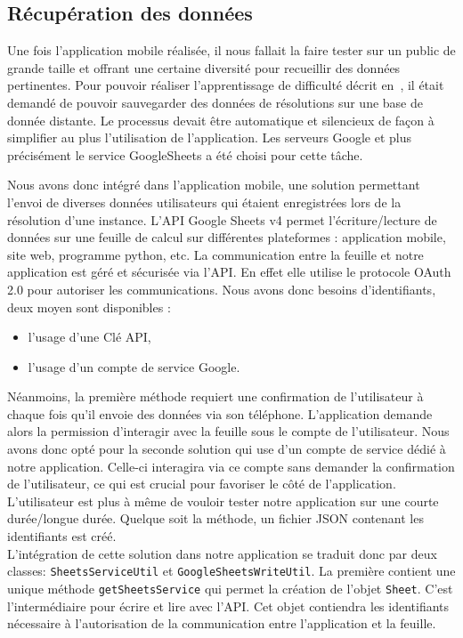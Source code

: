 \documentclass[../main.tex]{subfiles}
\begin{document}
	\subsection{Récupération des données}
	
	Une fois l'application mobile réalisée, il nous fallait la faire tester sur un public de grande taille et offrant une certaine diversité pour recueillir des données pertinentes. Pour pouvoir réaliser l'apprentissage de difficulté décrit en~, il était demandé de pouvoir sauvegarder des données de résolutions sur une base de donnée distante. Le processus devait être automatique et silencieux de façon à simplifier au plus l'utilisation de l'application. Les serveurs Google et plus précisément le service GoogleSheets a été choisi pour cette tâche. 

Nous avons donc intégré dans l'application mobile, une solution permettant l'envoi de diverses données utilisateurs qui étaient enregistrées lors de la résolution d'une instance. L’API Google Sheets v4 permet l’écriture/lecture de données sur une feuille de calcul sur différentes plateformes : application mobile, site web, programme python, etc. La communication entre la feuille et notre application est géré et sécurisée via l’API. En effet elle utilise le protocole OAuth 2.0 pour autoriser les communications. Nous avons donc besoins d'identifiants, deux moyen sont disponibles :
\begin{itemize}
\item l’usage d’une Clé API,
\item l’usage d’un compte de service Google.
\end{itemize}

Néanmoins, la première méthode requiert une confirmation de l'utilisateur à chaque fois qu'il envoie des données via son téléphone. L'application demande alors la permission d'interagir avec la feuille sous le compte de l'utilisateur. Nous avons donc opté pour la seconde solution qui use d'un compte de service dédié à notre application. Celle-ci interagira via ce compte sans demander la confirmation de l'utilisateur, ce qui est crucial pour favoriser le côté  de l'application. L'utilisateur est plus à même de vouloir tester notre application sur une courte durée/longue durée. Quelque soit la méthode, un fichier JSON contenant les identifiants est créé.\\

L'intégration de cette solution dans notre application se traduit donc par deux classes: \texttt{SheetsServiceUtil} et \texttt{GoogleSheetsWriteUtil}. La première contient une unique méthode \texttt{getSheetsService} qui permet la création de l’objet \texttt{Sheet}. C'est l'intermédiaire pour écrire et lire avec l'API. Cet objet contiendra les identifiants nécessaire à l'autorisation de la communication entre l'application et la feuille.
\end{document}
